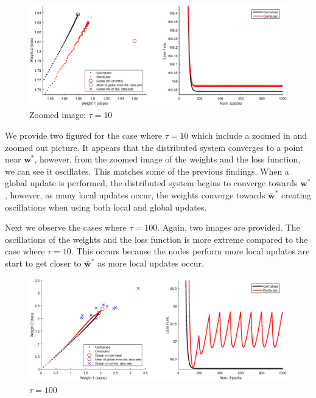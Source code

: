 \documentclass[11pt, fullpage,letterpaper]{article}
\begin{document}
\begin{enumerate}
\begin{enumerate}
   \begin{figure}[H]
\begin{center}
\advance\leftskip-3cm
\advance\rightskip-3cm
\includegraphics[width=20cm]{tau=10_zoom.eps}
\caption{Zoomed image: $\tau=10$}
\end{center}\end{figure}

We provide two figured for the case where $\tau=10$ which include a zoomed in and zoomed out picture. It appears that the distributed system converges to a point near $\boldsymbol{w}^*$, however, from the zoomed image of the weights and the loss function, we can see it oscillates. This matches some of the previous findings. When a global update is performed, the distributed system begins to converge towards $\boldsymbol{w}^*$, however, as many local updates occur, the weights converge towards $\bar{\boldsymbol{w}}^*$ creating oscillations when using both local and global updates.

Next we observe the cases where $\tau = 100$. Again, two images are provided. The oscillations of the weights and the loss function is more extreme compared to the case where $\tau=10$. This occurs because the nodes perform more local updates are start to get closer to $\bar{\boldsymbol{w}}^*$ as more local updates occur.
   \begin{figure}[H]
\begin{center}
\advance\leftskip-3cm
\advance\rightskip-3cm
\includegraphics[width=20cm]{tau=100.eps}
\caption{$\tau=100$}
\end{center}\end{figure}


\end{enumerate}
\end{enumerate}
\end{document}
